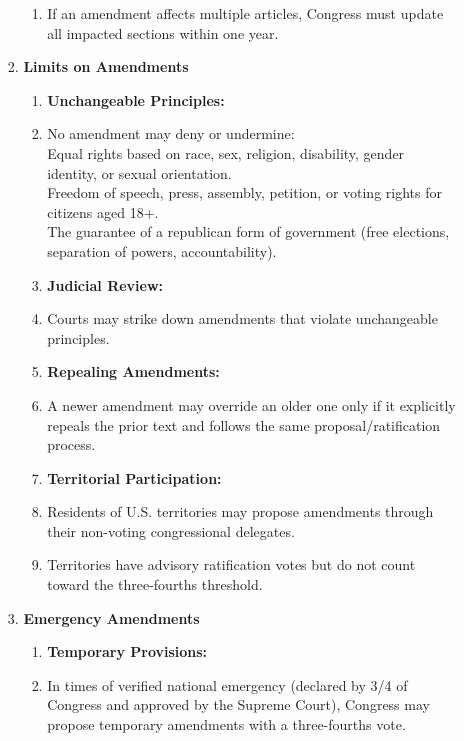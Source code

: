 \documentclass{article}
\begin{document}
\begin{multicols}{2}
\begin{enumerate}[label=\Alph*)]
\begin{enumerate}[label=\Alph*), start=4]
\begin{enumerate}[label=\Alph*), start=14]
\begin{enumerate}[label=4.1.\arabic*]
        \item If an amendment affects multiple articles, Congress must update all impacted sections within one year.
    \end{enumerate}
    
    \item \textbf{Limits on Amendments}
    
    \begin{enumerate}[label=4.2.\arabic*]
        \item[] \textbf{Unchangeable Principles:}
        \item No amendment may deny or undermine: \\
        Equal rights based on race, sex, religion, disability, gender identity, or sexual orientation. \\
        Freedom of speech, press, assembly, petition, or voting rights for citizens aged 18+. \\
        The guarantee of a republican form of government (free elections, separation of powers, accountability).
        
        \item[] \textbf{Judicial Review:}
        \item Courts may strike down amendments that violate unchangeable principles.
        
        \item[] \textbf{Repealing Amendments:}
        \item A newer amendment may override an older one only if it explicitly repeals the prior text and follows the same proposal/ratification process.
        
        \item[] \textbf{Territorial Participation:}
        \item Residents of U.S. territories may propose amendments through their non-voting congressional delegates.
        
        \item Territories have advisory ratification votes but do not count toward the three-fourths threshold.
    \end{enumerate}
    
    \item \textbf{Emergency Amendments}
    
    \begin{enumerate}[label=4.3.\arabic*]
        \item[] \textbf{Temporary Provisions:}
        \item In times of verified national emergency (declared by 3/4 of Congress and approved by the Supreme Court), Congress may propose temporary amendments with a three-fourths vote.
        

\end{enumerate}
\end{enumerate}
\end{enumerate}
\end{enumerate}
\end{multicols}
\end{document}
